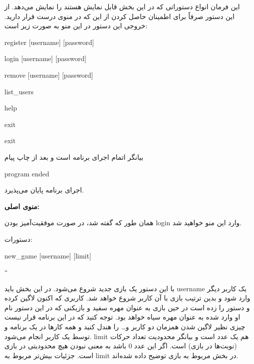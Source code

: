 \documentclass[]{article}
\begin{document}
این فرمان انواع دستوراتی که در این بخش قابل نمایش هستند را نمایش می‌دهد. از این دستور صرفاً برای اطمینان حاصل کردن از این که در منوی درست قرار دارید. خروجی این دستور در این منو به صورت زیر است:



\begin{tcolorbox}[boxrule=0pt]
	\begin{latin}
  	  \large{
  	  	register [username] [password]
  	  	
login [username] [password]

remove [username] [password]

list\_users

help

exit
		}
	\end{latin}
\end{tcolorbox}

\hrulefill




\begin{tcolorbox}[boxrule=0pt]
	\begin{latin}
  	  \large{
  	  	exit
		}
	\end{latin}
\end{tcolorbox}

بیانگر اتمام اجرای برنامه است و بعد از چاپ پیام



\begin{tcolorbox}[boxrule=0pt]
	\begin{latin}
  	  \large{
  	  	program ended
		}
	\end{latin}
\end{tcolorbox}

اجرای برنامه پایان می‌پذیرد.

\hrulefill

\hrulefill

\textbf{منوی اصلی:}

همان طور که گفته شد، در صورت موفقیت‌آمیز بودن login وارد این منو خواهید شد.

دستورات:

\begin{tcolorbox}[boxrule=0pt]
	\begin{latin}
  	  \large{
  	  	new\_game [username] [limit]
		}
	\end{latin}
\end{tcolorbox}

``

با این دستور یک بازی جدید شروع می‌شود. در این بخش باید username یک کاربر دیگر وارد شود و بدین ترتیب بازی با آن کاربر شروع خواهد شد. کاربری که اکنون لاگین کرده و دستور را زده است در حین بازی به عنوان مهره سفید و بازیکنی که در این دستور نام او وارد شده به عنوان مهره سیاه خواهد بود. توجه کنید که در این برنامه قرار نیست چیزی نظیر لاگین شدن همزمان دو کاربر و… را هندل کنید و همه کارها در یک برنامه و توسط یک کاربر انجام می‌شود. limit هم یک عدد است و بیانگر محدودیت تعداد حرکات (نوبت‌ها در بازی) است. اگر این عدد 0 باشد به معنی نبودن هیچ محدودیتی در بازی است. جزئیات بیش‌تر مربوط به limit در بخش مربوط به بازی توضیح داده شده‌اند.
\end{document}
